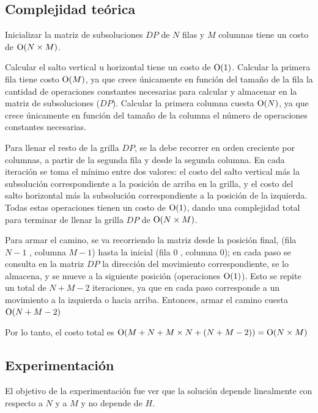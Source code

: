     \subsection{Complejidad teórica}
	Inicializar la matriz de subsoluciones $DP$ de $N$ filas y $M$ columnas
	tiene un costo de $\operatorname{O}(N \times M)$.

	Calcular el salto vertical u horizontal tiene un costo de $\operatorname{O}(1)$.
	Calcular la primera fila tiene costo $\operatorname{O}(M)$, ya que crece únicamente en
	función del tamaño de la fila la cantidad de operaciones constantes
	necesarias para calcular y almacenar en la matriz de subsoluciones ($DP$).
	Calcular la primera columna cuesta $\operatorname{O}(N)$, ya que crece únicamente en
	función del tamaño de la columna el número de operaciones constantes
	necesarias.

    Para llenar el resto de la grilla $DP$, se la debe recorrer en orden creciente por columnas, a partir de la segunda fila y desde la segunda columna. En cada iteración se toma el mínimo entre dos valores: el costo del salto vertical más la subsolución correspondiente a la posición de arriba en la grilla, y el costo del salto horizontal más la subsolución correspondiente a la posición de la izquierda. Todas estas operaciones tienen un costo de $\operatorname{O}(1)$, dando una complejidad total para terminar de llenar la grilla $DP$ de $\operatorname{O}(N \times M)$.

    Para armar el camino, se va recorriendo la matriz desde la posición final, (fila $N - 1$ , columna $M - 1$) hasta la inicial (fila $0$ , columna $0$); en cada paso se consulta en la matriz $DP$ la dirección del movimiento correspondiente, se lo almacena, y se mueve a la siguiente posición (operaciones $\operatorname{O}(1)$). Esto se repite un total de $N + M - 2$ iteraciones, ya que en cada paso corresponde a un movimiento a la izquierda o hacia arriba. Entonces, armar el camino cuesta $\operatorname{O}(N + M - 2)$

    Por lo tanto, el costo total es $\operatorname{O}( M + N + M \times N + (N + M - 2) ) = \operatorname{O}(N \times M)$

    \subsection{Experimentación}
    El objetivo de la experimentación fue ver que la solución depende linealmente con respecto a $N$ y a $M$ y no depende de $H$.

